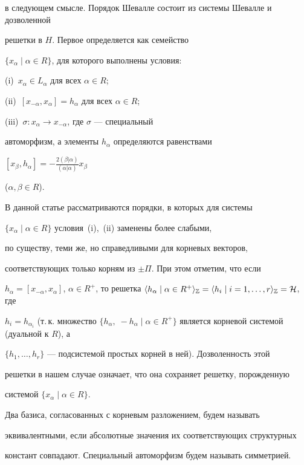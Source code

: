 в следующем смысле. Порядок Шевалле состоит из системы Шевалле и дозволенной


решетки в $H$. Первое определяется как семейство


$\{x_\alpha\mid \alpha\in R\}$, для которого выполнены условия:


(i)~$x_\alpha\in L_\alpha$ для всех $\alpha\in R$;


(ii)~$[x_{-\alpha},x_\alpha]=h_\alpha$ для всех $\alpha\in R$;


(iii)~$\sigma: x_\alpha\to x_{-\alpha}$, где $\sigma$ --- специальный


автоморфизм, а элементы $h_\alpha$ определяются равенствами


$[x_\beta,h_\alpha]=-\frac{2(\beta|\alpha)}{(\alpha|\alpha)}x_\beta$


($\alpha,\beta\in R$).


В данной статье рассматриваются порядки, в которых для системы


$\{x_\alpha\mid \alpha\in R\}$ условия~(i),~(ii) заменены более слабыми,


по существу, теми же, но справедливыми для корневых векторов,


соответствующих только корням из $\pm\Pi$. При этом отметим, что если


$h_\alpha=[x_{-\alpha},x_\alpha]$, $\alpha\in


R^+$, то решетка $\langle h_\alpha\mid \alpha\in R^+\rangle_{\Bbb Z}=


\langle h_i\mid i=1,\dotsc,r \rangle_{\Bbb Z}=\cal H$, где


$h_i=h_{\alpha_i}$ (т.\,к. множество $\{h_\alpha,\; -h_\alpha\mid 


\alpha\in R^+\}$ является корневой системой (дуальной к $R$), а


$\{h_1,\dotsc,h_r\}$ --- подсистемой простых корней в ней). Дозволенность этой


решетки в нашем случае означает, что она сохраняет решетку, порожденную


системой $\{x_\alpha\mid\alpha\in R\}$.





Два базиса, согласованных с корневым разложением, будем называть


эквивалентными, если абсолютные значения их соответствующих структурных


констант совпадают. Специальный автоморфизм будем называть симметрией.






